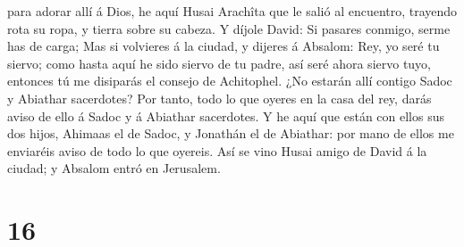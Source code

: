 para adorar allí á Dios, he aquí Husai Arachîta que le salió al
encuentro, trayendo rota su ropa, y tierra sobre su cabeza.
 Y díjole David: Si pasares conmigo, serme has de carga;
 Mas si volvieres á la ciudad, y dijeres á Absalom: Rey,
yo seré tu siervo; como hasta aquí he sido siervo de tu padre, así seré
ahora siervo tuyo, entonces tú me disiparás el consejo de Achitophel.
 ¿No estarán allí contigo Sadoc y Abiathar sacerdotes?
Por tanto, todo lo que oyeres en la casa del rey, darás aviso de ello á
Sadoc y á Abiathar sacerdotes.  Y he aquí que están con
ellos sus dos hijos, Ahimaas el de Sadoc, y Jonathán el de Abiathar: por
mano de ellos me enviaréis aviso de todo lo que oyereis. 
Así se vino Husai amigo de David á la ciudad; y Absalom entró en
Jerusalem.

\hypertarget{section-15}{%
\section{16}\label{section-15}}

